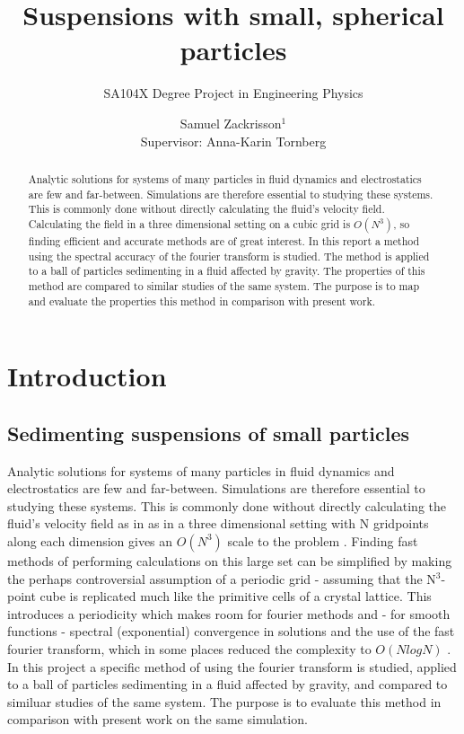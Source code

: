 \documentclass[a4paper,twoside=false,abstract=false,numbers=noenddot,
titlepage=false,headings=small,parskip=half,version=last]{scrartcl}
\title{Suspensions with small, spherical particles}
\subtitle{SA104X Degree Project in Engineering Physics}
\author[2]{Samuel Zackrisson$^1$ \\ \footnotesize Supervisor: Anna-Karin Tornberg}
\affil[1,2]{Department for Numerical Analysis, Royal Institute of Technology}
\affil[1]{samuelz@kth.se}
\affil[2]{akto@kth.se}
\begin{document}
\maketitle
\thispagestyle{empty}

\begin{abstract}
Analytic solutions for systems of many particles in fluid dynamics and electrostatics are few and far-between.
Simulations are therefore essential to studying these systems.
This is commonly done without directly calculating the fluid's velocity field.
Calculating the field in a three dimensional setting on a cubic grid is $O(N^3)$, so finding efficient and accurate methods are of great interest.
In this report a method using the spectral accuracy of the fourier transform is studied.
The method is applied to a ball of particles sedimenting in a fluid affected by gravity.
The properties of this method are compared to similar studies of the same system.
The purpose is to map and evaluate the properties this method in comparison with present work.
\end{abstract}

\tableofcontents

\section{Introduction}
\subsection{Sedimenting suspensions of small particles}
Analytic solutions for systems of many particles in fluid dynamics and electrostatics are few and far-between. Simulations are therefore essential to studying these systems. This is commonly done without directly calculating the fluid's velocity field as in as in a three dimensional setting with N gridpoints along each dimension gives an $O(N^3)$ scale to the problem \cite{fallingclouds}. Finding fast methods of performing calculations on this large set can be simplified by making the perhaps controversial assumption of a periodic grid - assuming that the N$^3$-point cube is replicated much like the primitive cells of a crystal lattice. This introduces a periodicity which makes room for fourier methods and - for smooth functions - spectral (exponential) convergence in solutions and the use of the fast fourier transform, which in some places reduced the complexity to $O(NlogN)$ \cite{fluctuatesediment}. In this project a specific method of using the fourier transform is studied, applied to a ball of particles sedimenting in a fluid affected by gravity, and compared to similuar studies of the same system. The purpose is to evaluate this method in comparison with present work on the same simulation.
\end{document}
